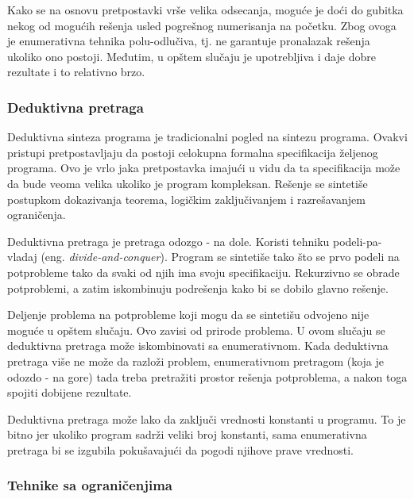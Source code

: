 Kako se na osnovu pretpostavki vrše velika odsecanja, moguće je doći do gubitka nekog od mogućih rešenja usled pogrešnog numerisanja na početku. Zbog ovoga je enumerativna tehnika polu-odlučiva, tj. ne garantuje pronalazak rešenja ukoliko ono postoji. Međutim, u opštem slučaju je upotrebljiva i daje dobre rezultate i to relativno brzo.


\subsubsection{Deduktivna pretraga}
\label{subsubsec:Deductive}

Deduktivna sinteza programa je tradicionalni pogled na sintezu programa. Ovakvi pristupi pretpostavljaju da postoji celokupna formalna spe\-ci\-fi\-ka\-ci\-ja željenog programa. Ovo je vrlo jaka pretpostavka imajući u vidu da ta specifikacija može da bude veoma velika ukoliko je program kompleksan. Rešenje se sintetiše postupkom dokazivanja teorema, logičkim zaključivanjem i razrešavanjem ograničenja.

Deduktivna pretraga je pretraga odozgo - na dole. Koristi tehniku podeli-pa-vladaj (eng. \emph{divide-and-conquer}). Program se sintetiše tako što se prvo podeli na potprobleme tako da svaki od njih ima svoju specifikaciju. Rekurzivno se obrade potproblemi, a zatim iskombinuju podrešenja kako bi se dobilo glavno rešenje.

Deljenje problema na potprobleme koji mogu da se sintetišu odvojeno nije moguće u opštem slučaju. Ovo zavisi od prirode problema. U ovom slučaju se deduktivna pretraga može iskombinovati sa enumerativnom. Kada deduktivna pretraga više ne može da razloži problem, enumerativnom pretragom (koja je odozdo - na gore) tada treba pretražiti prostor rešenja potproblema, a nakon toga spojiti dobijene rezultate.

Deduktivna pretraga može lako da zaključi vrednosti konstanti u programu. To je bitno jer ukoliko program sadrži veliki broj konstanti, sama enumerativna pretraga bi se izgubila pokušavajući da pogodi njihove prave vrednosti.


\subsubsection{Tehnike sa ograničenjima}
\label{subsubsec:ConstraintSolving}

